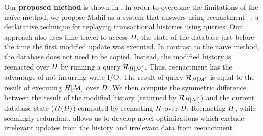 Our \textbf{proposed method} is shown in . In order to overcome the limitations of the naïve method, we propose Mahif as a system that answers \abbrHWs using reenactment~\cite{AG14,AG17,AG18}%
, a declarative technique for replaying transactional histories using queries.
Our approach also uses time travel to access $D$, the state of the database just before the time the first modified update was executed. In contrast to the naïve method, the database does not need to be copied. %
Instead, the modified history is reenacted over $D$ by running a query $\mathcal{R}_{H[\mathcal{M}]}$.
Thus, reenactment has the advantage of not incurring write I/O.
The result of query $\mathcal{R}_{H[\mathcal{M}]}$ is equal to the result of executing $H[\mathcal{M}]$ over $D$.  %
We then compute the symmetric difference between the result of the modified history (returned by $\mathcal{R}_{H[\mathcal{M}]}$) and the current database state ($H(D)$) computed by reenacting $H$ over $D$. Reenacting $H$, while seemingly redundant, allows us to develop novel optimizations which %
exclude irrelevant updates from the history and irrelevant data from reenactment. %


